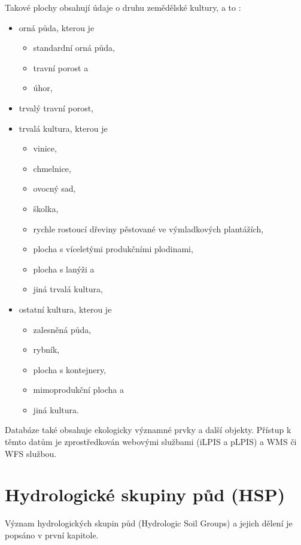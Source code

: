 \documentclass[a4paper,oneside,12pt]{book}
\begin{document}
Takové plochy obsahují údaje o druhu zemědělské kultury, a to \cite{sSYEwLE0rNKoWGYk}:
\begin{itemize}
    \item orná půda, kterou je
    \begin{itemize}
        \item standardní orná půda,
        \item travní porost a
        \item úhor,
    \end{itemize}
    \item trvalý travní porost,
    \item trvalá kultura, kterou je
    \begin{itemize}
        \item vinice,
        \item chmelnice,
        \item ovocný sad,
        \item školka,
        \item rychle rostoucí dřeviny pěstované ve výmladkových plantážích,
        \item plocha s víceletými produkčními plodinami,
        \item plocha s lanýži a
        \item jiná trvalá kultura, 
    \end{itemize}
    \item ostatní kultura, kterou je
    \begin{itemize}
        \item zalesněná půda,
        \item rybník,
        \item plocha s kontejnery,
        \item mimoprodukční plocha a
        \item jiná kultura.
    \end{itemize}
\end{itemize}

\hspace{10mm} Databáze také obsahuje ekologicky významné prvky a další objekty. \cite{sSYEwLE0rNKoWGYk}
Přístup k těmto datům je zprostředkován webovými službami (iLPIS a pLPIS)  a WMS či WFS službou. \cite{Devaty2018}

\section{Hydrologické skupiny půd (HSP)} \label{hsp}
\hspace{10mm}Význam hydrologických skupin půd (Hydrologic Soil Groups) a jejich dělení je popsáno v první kapitole. 
\end{document}
